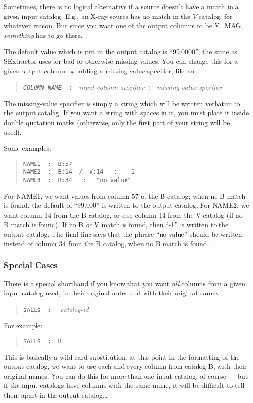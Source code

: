 \documentclass[10pt]{article}
\begin{document}
Sometimes, there is no logical alternative if a source doesn't have a
match in a given input catalog.  E.g., an X-ray source has no match
in the $V$ catalog, for whatever reason.  But since you want one of
the output columns to be V\_MAG, \textit{something} has to go there.

The default value which is put in the output catalog is ``99.0000'', 
the same as SExtractor uses for bad or otherwise missing values.  You 
can change this for a given output column by adding a missing-value 
specifier, like so:
\begin{quote}
  \texttt{{\sl COLUMN\_NAME}  ~:~   
  }\textit{input-column-specifier}\texttt{~:~} 
  \textit{missing-value-specifier}
\end{quote}
The missing-value specifier is simply a string which will be written 
verbatim to the output catalog.  If you want a string with spaces in 
it, you must place it inside double quotation marks (otherwise, only 
the first part of your string will be used).

Some examples:
\begin{quote}
  \texttt{NAME1  ~:~   B:57} \\
  \texttt{NAME2  ~:~   B:14~ /~ V:14 ~ : ~ -1} \\
  \texttt{NAME3  ~:~   B:34 ~ : ~ "no value"}
\end{quote}
For NAME1, we want values from column 57 of the B catalog; when no B
match is found, the default of ``99.000'' is written to the output
catalog.  For NAME2, we want column 14 from the B catalog, or else
column 14 from the V catalog (if no B match is found).  If no B
\textit{or} V match is found, then ``-1'' is written to the output
catalog.  The final line says that the phrase ``no value'' should be
written instead of column 34 from the B catalog, when no B match is
found.


\subsubsection{Special Cases}

There is a special shorthand if you know that you want \textit{all} 
columns from a given input catalog used, in their original order and 
with their original names:
\begin{quote}
  \texttt{\$ALL\$  ~:~ } \textit{catalog-id}
\end{quote}
For example:
\begin{quote}
  \texttt{\$ALL\$  ~:~ B}
\end{quote}
This is basically a wild-card substitution: at this point in the
formatting of the output catalog, we want to use each and every column
from catalog B, with their original names.  You can do this for more
than one input catalog, of course --- but if the input catalogs have
columns with the same name, it will be difficult to tell them apart in
the output catalog\ldots.
\end{document}
